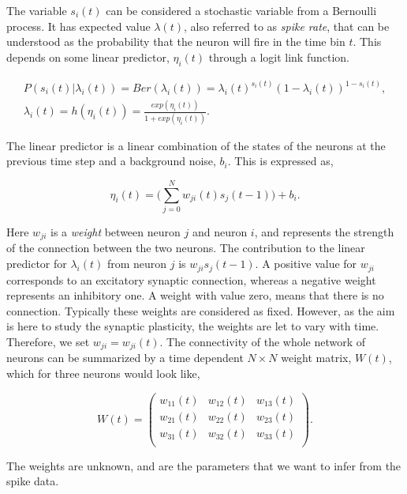 The variable $s_{i}(t)$ can be considered a stochastic variable from a Bernoulli process. It has expected value $\lambda (t)$, also referred to as \textit{spike rate}, that can be understood as the probability that the neuron will fire in the time bin $t$. This depends on some linear predictor, $\eta_i(t)$ through a logit link function. 

\begin{equation}
\begin{split}
P(s_i(t)|\lambda_i(t)) =  Ber(\lambda_i(t)) = \lambda_i(t)^{s_i(t)}(1-\lambda_i(t))^{1-s_i(t)}, \\ \lambda_i(t) = h(\eta_i(t))= \frac{exp(\eta_i(t))}{1+exp(\eta_i(t))}.
\end{split}
\end{equation}

The linear predictor is a linear combination of the states of the neurons at the previous time step and a background noise, $b_i$. This is expressed as,

\begin{equation}
    \eta_i(t) = \Big (\sum_{j=0}^{N}  w_{ji}(t)s_j(t-1) \Big) + b_i.
\end{equation}

Here $w_{ji}$ is a \textit{weight} between neuron $j$ and neuron $i$, and represents the strength of the connection between the two neurons. The contribution to the linear predictor for $\lambda_i(t)$ from neuron $j$ is $w_{ji}s_j(t-1)$. A positive value for $w_{ji}$ corresponds to an excitatory synaptic connection, whereas a negative weight represents an inhibitory one. A weight with value zero, means that there is no connection. Typically these weights are considered as fixed. However, as the aim is here to study the synaptic plasticity, the weights are let to vary with time. Therefore, we set $w_{ji} = w_{ji}(t)$. The connectivity of the whole network of neurons can be summarized by a time dependent $N \times N$ weight matrix, $W(t)$, which for three neurons would look like, 

\begin{equation*}
W(t) = 
\begin{pmatrix}
w_{11}(t) & w_{12}(t) & w_{13}(t)\\
w_{21}(t) & w_{22}(t) & w_{23}(t)\\
w_{31}(t) & w_{32}(t) & w_{33}(t)\\
\end{pmatrix}.
\end{equation*}

The weights are unknown, and are the parameters that we want to infer from the spike data. 



